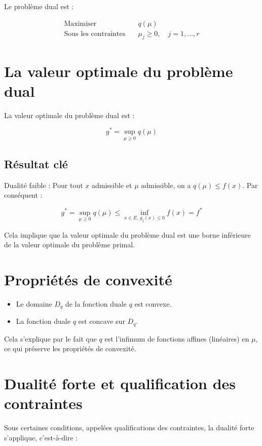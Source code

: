 \documentclass{article}
\begin{document}
Le problème dual est :

\begin{align*}
\text{Maximiser} \quad & q(\mu) \\
\text{Sous les contraintes} \quad & \mu_j \geq 0, \quad j = 1, \dotsc, r
\end{align*}

\section{La valeur optimale du problème dual}

La valeur optimale du problème dual est :

\[
g^* = \sup_{\mu \geq 0} q(\mu)
\]

\subsection{Résultat clé}

Dualité faible : Pour tout $x$ admissible et $\mu$ admissible, on a $q(\mu) \leq f(x)$. Par conséquent :

\[
g^* = \sup_{\mu \geq 0} q(\mu) \leq \inf_{x \in E, \, g_j(x) \leq 0} f(x) = f^*
\]

Cela implique que la valeur optimale du problème dual est une borne inférieure de la valeur optimale du problème primal.

\section{Propriétés de convexité}

\begin{itemize}
    \item Le domaine $D_q$ de la fonction duale $q$ est convexe.
    \item La fonction duale $q$ est concave sur $D_q$.
\end{itemize}

Cela s'explique par le fait que $q$ est l'infimum de fonctions affines (linéaires) en $\mu$, ce qui préserve les propriétés de convexité.

\section{Dualité forte et qualification des contraintes}

Sous certaines conditions, appelées qualifications des contraintes, la dualité forte s'applique, c'est-à-dire :
\end{document}
